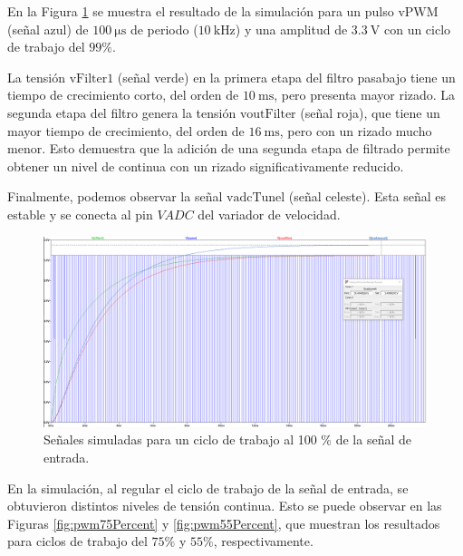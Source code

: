 En la Figura \ref{fig:pwm100Percent} se muestra el resultado de la simulación para un pulso $\text{vPWM}$ (señal azul) de $\SI{100}{\micro\second}$ de periodo ($\SI{10}{\kilo\hertz}$) y una amplitud de $\SI{3.3}{\volt}$ con un ciclo de trabajo del $99\%$.

La tensión $\text{vFilter1}$ (señal verde) en la primera etapa del filtro pasabajo tiene un tiempo de crecimiento corto, del orden de $\SI{10}{\milli\second}$, pero presenta mayor rizado. La segunda etapa del filtro genera la tensión $\text{voutFilter}$ (señal roja), que tiene un mayor tiempo de crecimiento, del orden de $\SI{16}{\milli\second}$, pero con un rizado mucho menor. Esto demuestra que la adición de una segunda etapa de filtrado permite obtener un nivel de continua con un rizado significativamente reducido.

Finalmente, podemos observar la señal $\text{vadcTunel}$ (señal celeste). Esta señal es estable y se conecta al pin $VADC$ del variador de velocidad.


\begin{figure}[H]
    \centering
    \includegraphics[width=1.1\linewidth]{Figuras/datalogger/Hardware/pwm100Percent.png}
    \caption{Señales simuladas para un ciclo de trabajo al 100 \% de la señal de entrada.}
    \label{fig:pwm100Percent}
\end{figure}
En la simulación, al regular el ciclo de trabajo de la señal de entrada, se obtuvieron distintos niveles de tensión continua. Esto se puede observar en las Figuras \ref{fig:pwm75Percent} y \ref{fig:pwm55Percent}, que muestran los resultados para ciclos de trabajo del $75\%$ y $55\%$, respectivamente.

